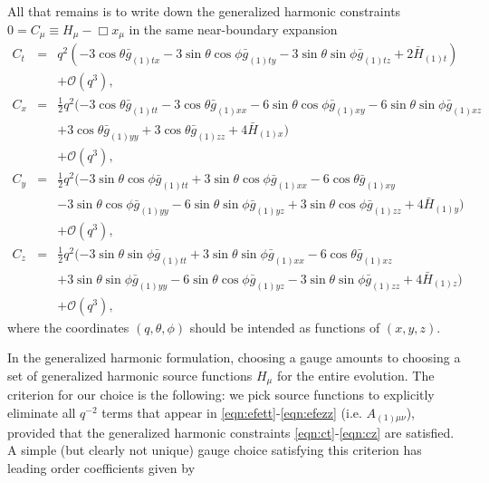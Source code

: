 \documentclass[a4paper,11pt]{article}
\numberwithin{equation}{section}
\begin{document}
All that remains is to write down the generalized harmonic constraints $0=C_\mu \equiv H_\mu-\Box x_\mu$ in the same near-boundary expansion
\begin{eqnarray}\label{eqn:ct}
C_t&=&q^2 (-3 \cos \theta  \bar{g}_{(1)tx}-3 \sin \theta  \cos \phi  \bar{g}_{(1)ty}-3 \sin \theta  \sin \phi \bar{g}_{(1)tz}+2
   \bar{H}_{(1) t}) \nonumber \\
   &&+\mathcal{O}(q^3),\\
%
\label{eqn:cx}
C_x&=&\frac{1}{2} q^2 (-3 \cos \theta  \bar{g}_{(1)tt}-3 \cos \theta  \bar{g}_{(1)xx}-6 \sin \theta  \cos \phi  \bar{g}_{(1)xy}-6 \sin
   \theta  \sin \phi  \bar{g}_{(1)xz} \nonumber \\
  &&+3 \cos \theta  \bar{g}_{(1)yy}+3
   \cos \theta  \bar{g}_{(1)zz}+4 \bar{H}_{(1) x}) \nonumber \\
   &&+\mathcal{O}(q^3),\\
%
\label{eqn:cy}
C_y&=&\frac{1}{2} q^2 (-3 \sin \theta  \cos \phi  \bar{g}_{(1)tt}+3 \sin
   \theta  \cos \phi  \bar{g}_{(1)xx}-6 \cos \theta  \bar{g}_{(1)xy} \nonumber \\
   &&-3
   \sin \theta  \cos \phi  \bar{g}_{(1) yy}-6 \sin \theta  \sin \phi
   \bar{g}_{(1)yz}+3 \sin \theta  \cos \phi  \bar{g}_{(1)zz}+4
   \bar{H}_{(1) y}) \nonumber \\
   &&+\mathcal{O}(q^3),\\
%
\label{eqn:cz}
C_z&=&\frac{1}{2} q^2 (-3 \sin \theta \sin \phi  \bar{g}_{(1)tt}+3 \sin
   \theta \sin \phi \bar{g}_{(1)xx}-6 \cos \theta  \bar{g}_{(1)xz} \nonumber \\
   &&+3
   \sin \theta \sin \phi  \bar{g}_{(1)yy}-6 \sin \theta  \cos \phi    \bar{g}_{(1)yz}-3 \sin \theta  \sin \phi  \bar{g}_{(1)zz}+4
   \bar{H}_{(1)z}) \nonumber \\
   &&+\mathcal{O}(q^3),
\end{eqnarray}
where the coordinates $(q,\theta,\phi)$ should be intended as functions of $(x,y,z)$.

In the generalized harmonic formulation, choosing a gauge amounts to choosing a set of generalized harmonic source functions $H_\mu$ for the entire evolution.
The criterion for our choice is the following: we pick source functions to explicitly eliminate all $q^{-2}$ terms that appear in \eqref{eqn:efett}-\eqref{eqn:efezz} (i.e. $A_{(1)\mu\nu}$), provided that the generalized harmonic constraints \eqref{eqn:ct}-\eqref{eqn:cz} are satisfied.
A simple (but clearly not unique) gauge choice satisfying this criterion has leading order coefficients given by
\end{document}
